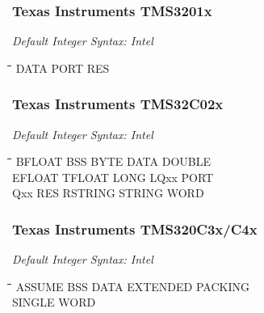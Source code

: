 \subsubsection{Texas Instruments TMS3201x}

{\em Default Integer Syntax: Intel}

{\tt\begin{tabbing}
\hspace{3cm}\=\hspace{3cm}\=\hspace{3cm}\=\hspace{3cm}\=\kill
DATA       \> PORT        \> RES \\
\end{tabbing}}

\subsubsection{Texas Instruments TMS32C02x}

{\em Default Integer Syntax: Intel}

{\tt\begin{tabbing}
\hspace{3cm}\=\hspace{3cm}\=\hspace{3cm}\=\hspace{3cm}\=\kill
BFLOAT     \> BSS         \> BYTE        \> DATA        \> DOUBLE \\ 
EFLOAT     \> TFLOAT      \> LONG        \> LQxx        \> PORT \\
Qxx        \> RES         \> RSTRING     \> STRING      \> WORD \\
\end{tabbing}}

\subsubsection{Texas Instruments TMS320C3x/C4x}

{\em Default Integer Syntax: Intel}

{\tt\begin{tabbing}
\hspace{3cm}\=\hspace{3cm}\=\hspace{3cm}\=\hspace{3cm}\=\kill
ASSUME     \> BSS         \> DATA        \> EXTENDED    \> PACKING \\
SINGLE     \> WORD \\
\end{tabbing}}

